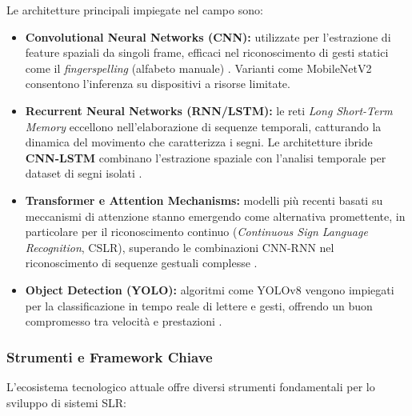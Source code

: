 Le architetture principali impiegate nel campo sono:

\begin{itemize}
    \item \textbf{Convolutional Neural Networks (CNN):} utilizzate per l'estrazione di feature spaziali da singoli frame, efficaci nel riconoscimento di gesti statici come il \textit{fingerspelling} (alfabeto manuale) \cite{lecun2015deeplearning}. Varianti come MobileNetV2 \cite{sandler2018mobilenetv2} consentono l'inferenza su dispositivi a risorse limitate.

    \item \textbf{Recurrent Neural Networks (RNN/LSTM):} le reti \textit{Long Short-Term Memory} \cite{hochreiter1997lstm} eccellono nell'elaborazione di sequenze temporali, catturando la dinamica del movimento che caratterizza i segni. Le architetture ibride \textbf{CNN-LSTM} combinano l'estrazione spaziale con l'analisi temporale per dataset di segni isolati \cite{kumar2024slr}.

    \item \textbf{Transformer e Attention Mechanisms:} modelli più recenti basati su meccanismi di attenzione \cite{vaswani2017attention} stanno emergendo come alternativa promettente, in particolare per il riconoscimento continuo (\textit{Continuous Sign Language Recognition}, CSLR), superando le combinazioni CNN-RNN nel riconoscimento di sequenze gestuali complesse \cite{rastgoo2024slrsurvey}.

    \item \textbf{Object Detection (YOLO):} algoritmi come YOLOv8 \cite{ultralytics2023yolov8} vengono impiegati per la classificazione in tempo reale di lettere e gesti, offrendo un buon compromesso tra velocità e prestazioni \cite{alrashidi2024asl}.
\end{itemize}

\subsubsection{Strumenti e Framework Chiave}

L'ecosistema tecnologico attuale offre diversi strumenti fondamentali per lo sviluppo di sistemi SLR:

